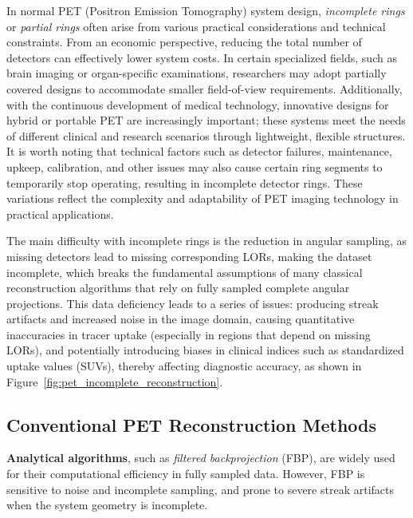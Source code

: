 \documentclass[
reprint,
superscriptaddress,
nofootinbib,
amsmath,amssymb,
aps,
prd,
]{revtex4-2}
\begin{document}
In normal PET (Positron Emission Tomography) system design, \emph{incomplete rings} or \emph{partial rings} often arise from various practical considerations and technical constraints. From an economic perspective, reducing the total number of detectors can effectively lower system costs. In certain specialized fields, such as brain imaging or organ-specific examinations, researchers may adopt partially covered designs to accommodate smaller field-of-view requirements. Additionally, with the continuous development of medical technology, innovative designs for hybrid or portable PET are increasingly important; these systems meet the needs of different clinical and research scenarios through lightweight, flexible structures. It is worth noting that technical factors such as detector failures, maintenance, upkeep, calibration, and other issues may also cause certain ring segments to temporarily stop operating, resulting in incomplete detector rings. These variations reflect the complexity and adaptability of PET imaging technology in practical applications.


The main difficulty with incomplete rings is the reduction in angular sampling, as missing detectors lead to missing corresponding LORs, making the dataset incomplete, which breaks the fundamental assumptions of many classical reconstruction algorithms that rely on fully sampled complete angular projections. This data deficiency leads to a series of issues: producing streak artifacts and increased noise in the image domain, causing quantitative inaccuracies in tracer uptake (especially in regions that depend on missing LORs), and potentially introducing biases in clinical indices such as standardized uptake values (SUVs), thereby affecting diagnostic accuracy, as shown in Figure~\ref{fig:pet_incomplete_reconstruction}.


\subsection{Conventional PET Reconstruction Methods}


\textbf{Analytical algorithms}, such as \emph{filtered backprojection} (FBP), are widely used for their computational efficiency in fully sampled data. However, FBP is sensitive to noise and incomplete sampling, and prone to severe streak artifacts when the system geometry is incomplete.
\end{document}
